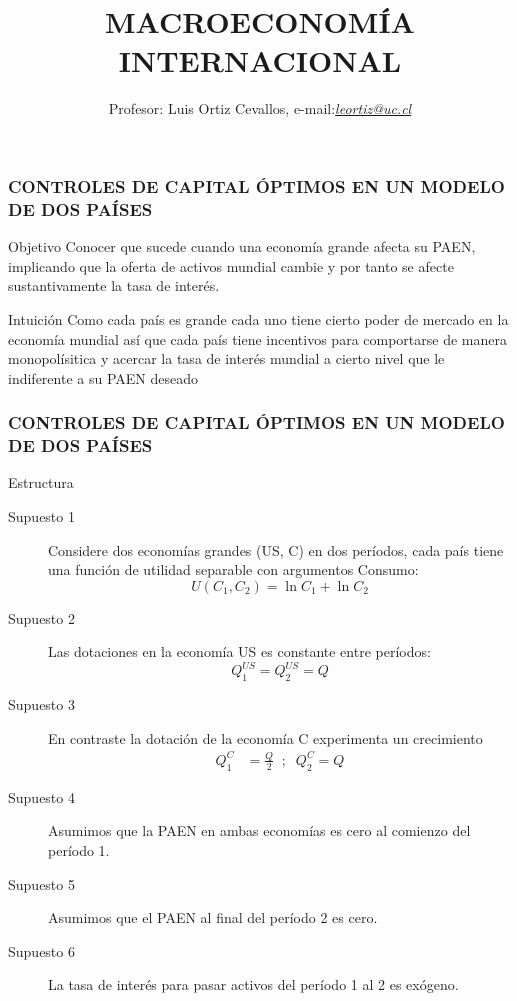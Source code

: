 \documentclass[10pt, xcolor=table, x11names]{beamer}
\author[Luis Ortiz Cevallos e-mail: \href{leortiz@uc.cl}{\textit{leortiz@uc.cl}}]{Profesor: Luis Ortiz Cevallos, e-mail:\href{leortiz@uc.cl}{\textit{leortiz@uc.cl}} }
\title[MACRO INTERNACIONAL]{\vspace*{1.0em} MACROECONOMÍA INTERNACIONAL}
\date[\href{https://ortiz-cevallos.github.io/luisortiz.github.io/ }{\textit{https://ortiz-cevallos.github.io/luisortiz.github.io/}}]{}
\begin{document}
\begin{frame}
\titlepage
\end{frame}


\begin{frame}[label=1]
	\frametitle{{\normalsize CONTROLES DE CAPITAL ÓPTIMOS EN UN MODELO DE DOS PAÍSES} {}}
	\begin{block} {Objetivo}
	Conocer que sucede cuando una economía grande afecta su PAEN, implicando que la oferta de activos mundial cambie y por tanto se afecte sustantivamente la tasa de interés. 	
	\end{block}	
	\begin{block} {Intuición}
		Como cada país es grande cada uno tiene cierto poder de mercado en la economía mundial así que cada país tiene incentivos para comportarse de manera monopolísitica y acercar la tasa de interés mundial a cierto nivel que le indiferente a su PAEN deseado
	\end{block}	
\end{frame}

\begin{frame}[plain]
	\frametitle{{\normalsize CONTROLES DE CAPITAL ÓPTIMOS EN UN MODELO DE DOS PAÍSES} {}}
	\begin{block} {Estructura}
		\begin{description}
			\item[Supuesto 1] Considere dos economías grandes (US, C) en dos períodos, cada país tiene una función de utilidad separable con argumentos Consumo:
			\begin{equation}
			U(C_{1}, C_{2})= \ln{C_{1}}+ \ln{C_{2}}
			\end{equation}
			\item[Supuesto 2] Las dotaciones en la economía US es constante entre períodos:
			\begin{equation}
			Q_{1}^{US}=	Q_{2}^{US}=Q 
			\end{equation}
			\item[Supuesto 3] En contraste la dotación de la economía C experimenta un crecimiento
			\begin{align}
			Q_{1}^{C}&=\frac{Q}{2}\;\; ; \;\; Q_{2}^{C}=Q
			\end{align}
			\item[Supuesto 4] Asumimos que la PAEN en ambas economías es cero al comienzo del período 1.
			\item[Supuesto 5] Asumimos que el PAEN al final del período 2 es cero.
			\item[Supuesto 6] La tasa de interés para pasar activos del período 1 al 2 es exógeno.
		\end{description}
	\end{block}	
\end{frame}
\end{document}
